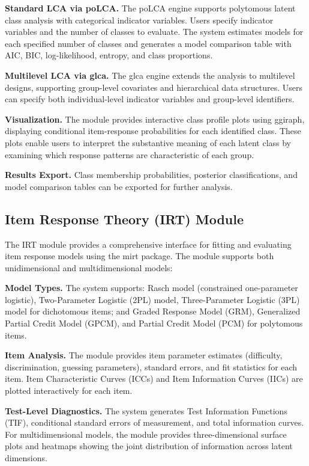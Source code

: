 \documentclass[12pt,a4paper]{article}
\begin{document}
\textbf{Standard LCA via poLCA.} The poLCA engine supports polytomous latent class analysis with categorical indicator variables. Users specify indicator variables and the number of classes to evaluate. The system estimates models for each specified number of classes and generates a model comparison table with AIC, BIC, log-likelihood, entropy, and class proportions.

\textbf{Multilevel LCA via glca.} The glca engine extends the analysis to multilevel designs, supporting group-level covariates and hierarchical data structures. Users can specify both individual-level indicator variables and group-level identifiers.

\textbf{Visualization.} The module provides interactive class profile plots using ggiraph, displaying conditional item-response probabilities for each identified class. These plots enable users to interpret the substantive meaning of each latent class by examining which response patterns are characteristic of each group.

\textbf{Results Export.} Class membership probabilities, posterior classifications, and model comparison tables can be exported for further analysis.

\subsection{Item Response Theory (IRT) Module}

The IRT module provides a comprehensive interface for fitting and evaluating item response models using the mirt package. The module supports both unidimensional and multidimensional models:

\textbf{Model Types.} The system supports: Rasch model (constrained one-parameter logistic), Two-Parameter Logistic (2PL) model, Three-Parameter Logistic (3PL) model for dichotomous items; and Graded Response Model (GRM), Generalized Partial Credit Model (GPCM), and Partial Credit Model (PCM) for polytomous items.

\textbf{Item Analysis.} The module provides item parameter estimates (difficulty, discrimination, guessing parameters), standard errors, and fit statistics for each item. Item Characteristic Curves (ICCs) and Item Information Curves (IICs) are plotted interactively for each item.

\textbf{Test-Level Diagnostics.} The system generates Test Information Functions (TIF), conditional standard errors of measurement, and total information curves. For multidimensional models, the module provides three-dimensional surface plots and heatmaps showing the joint distribution of information across latent dimensions.
\end{document}

